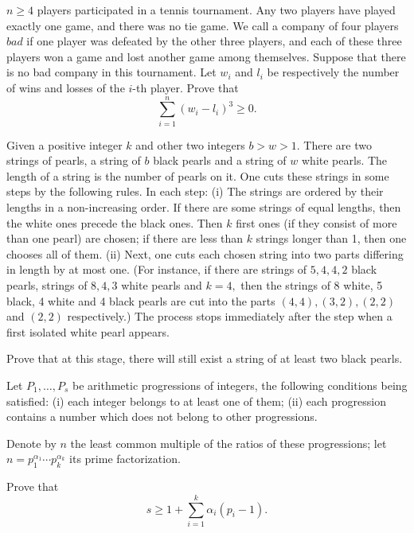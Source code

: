 \item[\textbf{C5.}]
$n \geq 4$
 players participated in a tennis tournament. Any two players have played exactly one game, and there was no tie game. We call a company of four players 
$bad$
 if one player was defeated by the other three players, and each of these three players won a game and lost another game among themselves. Suppose that there is no bad company in this tournament. Let 
$w_i$
 and 
$l_i$
 be respectively the number of wins and losses of the 
$i$-th player. Prove that 
\[\sum^n_{i=1} \left(w_i - l_i\right)^3 \geq 0.\]

\item[\textbf{C6.}]
Given a positive integer 
$k$
 and other two integers 
$b > w > 1.$
 There are two strings of pearls, a string of 
$b$
 black pearls and a string of 
$w$
 white pearls. The length of a string is the number of pearls on it. One cuts these strings in some steps by the following rules. In each step:
(i)
 The strings are ordered by their lengths in a non-increasing order. If there are some strings of equal lengths, then the white ones precede the black ones. Then 
$k$
 first ones (if they consist of more than one pearl) are chosen; if there are less than 
$k$
 strings longer than 1, then one chooses all of them.
(ii)
 Next, one cuts each chosen string into two parts differing in length by at most one. (For instance, if there are strings of 
$5, 4, 4, 2$
 black pearls, strings of 
$8, 4, 3$
 white pearls and 
$k = 4,$
 then the strings of 8 white, 5 black, 4 white and 4 black pearls are cut into the parts 
$(4,4), (3,2), (2,2)$
 and 
$(2,2)$
 respectively.) The process stops immediately after the step when a first isolated white pearl appears.


Prove that at this stage, there will still exist a string of at least two black pearls.

\item[\textbf{C7.}]
Let 
$P_1, \ldots , P_s$
 be arithmetic progressions of integers, the following conditions being satisfied:
(i)
 each integer belongs to at least one of them;
(ii)
 each progression contains a number which does not belong to other progressions.


Denote by 
$n$
 the least common multiple of the ratios of these progressions; let 
$n=p_1^{\alpha_1} \cdots p_k^{\alpha_k}$
 its prime factorization.


Prove that 
\[s \geq 1 + \sum^k_{i=1} \alpha_i (p_i - 1).\]

